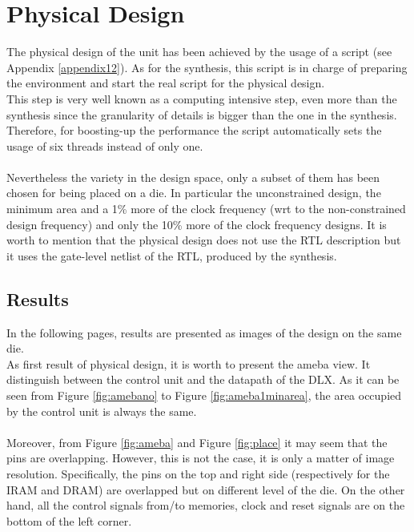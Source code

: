 \chapter{Physical Design}
\label{pd}
The physical design of the unit has been achieved by the usage of a script (see Appendix \ref{appendix12}). As for the synthesis, this script is in charge of preparing the environment and start the real script for the physical design.\\ This step is very well known as a computing intensive step, even more than the synthesis since the granularity of details is bigger than the one in the synthesis. Therefore, for boosting-up the performance the script automatically sets the usage of six threads instead of only one.\\\\
Nevertheless the variety in the design space, only a subset of them has been chosen for being placed on a die. In particular the unconstrained design, the minimum area and a 1\% more of the clock frequency (wrt to the non-constrained design frequency) and only the 10\% more of the clock frequency designs. It is worth to mention that the physical design does not use the RTL description but it uses the gate-level netlist of the RTL, produced by the synthesis.\\
\section{Results}
In the following pages, results are presented as images of the design on the same die.\\
As first result of physical design, it is worth to present the ameba view. It distinguish between the control unit and the datapath of the DLX. As it can be seen from Figure \ref{fig:amebano} to Figure \ref{fig:ameba1minarea}, the area occupied by the control unit is always the same.\\\\
Moreover, from Figure \ref{fig:ameba} and Figure \ref{fig:place} it may seem that the pins are overlapping. However, this is not the case, it is only a matter of image resolution. Specifically, the pins on the top and right side (respectively for the IRAM and DRAM) are overlapped but on different level of the die. On the other hand, all the control signals from/to memories, clock and reset signals are on the bottom of the left corner.\\\\


